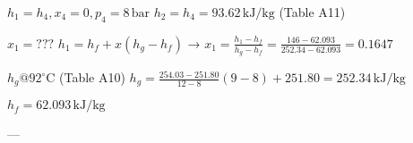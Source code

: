 \( h_1 = h_4, x_4 = 0, p_4 = 8 \, \text{bar} \)  
\( h_2 = h_4 = 93.62 \, \text{kJ/kg} \) (Table A11)  

\( x_1 = ??? \)  
\( h_1 = h_f + x (h_g - h_f) \)  
→ \( x_1 = \frac{h_1 - h_f}{h_g - h_f} = \frac{146 - 62.093}{252.34 - 62.093} = 0.1647 \)  

\( h_g @ 92^\circ \text{C} \) (Table A10)  
\( h_g = \frac{254.03 - 251.80}{12 - 8} (9 - 8) + 251.80 = 252.34 \, \text{kJ/kg} \)  

\( h_f = 62.093 \, \text{kJ/kg} \)  

---